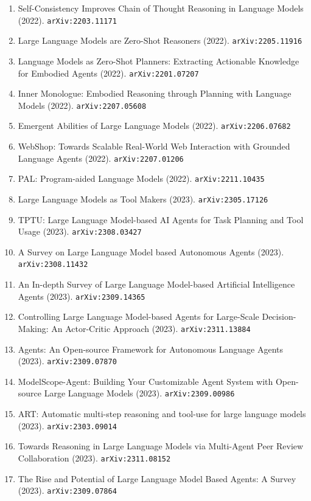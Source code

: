 \documentclass[11pt]{article}
\begin{document}
\begin{enumerate}
  \item Self-Consistency Improves Chain of Thought Reasoning in Language Models (2022). \texttt{arXiv:2203.11171}
  \item Large Language Models are Zero-Shot Reasoners (2022). \texttt{arXiv:2205.11916}
  \item Language Models as Zero-Shot Planners: Extracting Actionable Knowledge
  for Embodied Agents (2022). \texttt{arXiv:2201.07207}
  \item Inner Monologue: Embodied Reasoning through Planning with Language
  Models (2022). \texttt{arXiv:2207.05608}
  \item Emergent Abilities of Large Language Models (2022). \texttt{arXiv:2206.07682}
  \item WebShop: Towards Scalable Real-World Web Interaction with Grounded
  Language Agents (2022). \texttt{arXiv:2207.01206}
  \item PAL: Program-aided Language Models (2022). \texttt{arXiv:2211.10435}
  \item Large Language Models as Tool Makers (2023). \texttt{arXiv:2305.17126}
  \item TPTU: Large Language Model-based AI Agents for Task Planning and Tool Usage (2023). \texttt{arXiv:2308.03427}
  \item A Survey on Large Language Model based Autonomous Agents (2023). \texttt{arXiv:2308.11432}
  \item An In-depth Survey of Large Language Model-based Artificial Intelligence
  Agents (2023). \texttt{arXiv:2309.14365}
  \item Controlling Large Language Model-based Agents for Large-Scale
  Decision-Making: An Actor-Critic Approach (2023). \texttt{arXiv:2311.13884}
  \item Agents: An Open-source Framework for Autonomous Language Agents (2023). \texttt{arXiv:2309.07870}
  \item ModelScope-Agent: Building Your Customizable Agent System with
  Open-source Large Language Models (2023). \texttt{arXiv:2309.00986}
  \item ART: Automatic multi-step reasoning and tool-use for large language
  models (2023). \texttt{arXiv:2303.09014}
  \item Towards Reasoning in Large Language Models via Multi-Agent Peer Review
  Collaboration (2023). \texttt{arXiv:2311.08152}
  \item The Rise and Potential of Large Language Model Based Agents: A Survey (2023). \texttt{arXiv:2309.07864}

\end{enumerate}
\end{document}
